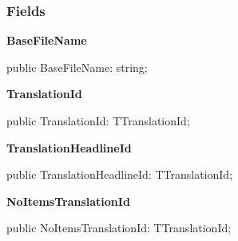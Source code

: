 \documentclass{report}
\newif\ifpdf
\begin{document}
\subsubsection*{\large{\textbf{Fields}}\normalsize\hspace{1ex}\hfill}
\begin{list}{}{
\setlength{\itemindent}{0cm}
\setlength{\listparindent}{0cm}
\setlength{\leftmargin}{\evensidemargin}
\addtolength{\leftmargin}{\tmplength}
\settowidth{\labelsep}{X}
\addtolength{\leftmargin}{\labelsep}
\setlength{\labelwidth}{\tmplength}
}
\label{PasDoc_Gen.TOverviewFileInfo-BaseFileName}
\item[\textbf{BaseFileName}\hfill]
\ifpdf
\begin{flushleft}
\fi
\begin{ttfamily}
public BaseFileName: string;\end{ttfamily}

\ifpdf
\end{flushleft}
\fi


\par  \label{PasDoc_Gen.TOverviewFileInfo-TranslationId}
\item[\textbf{TranslationId}\hfill]
\ifpdf
\begin{flushleft}
\fi
\begin{ttfamily}
public TranslationId: TTranslationId;\end{ttfamily}

\ifpdf
\end{flushleft}
\fi


\par  \label{PasDoc_Gen.TOverviewFileInfo-TranslationHeadlineId}
\item[\textbf{TranslationHeadlineId}\hfill]
\ifpdf
\begin{flushleft}
\fi
\begin{ttfamily}
public TranslationHeadlineId: TTranslationId;\end{ttfamily}

\ifpdf
\end{flushleft}
\fi


\par  \label{PasDoc_Gen.TOverviewFileInfo-NoItemsTranslationId}
\item[\textbf{NoItemsTranslationId}\hfill]
\ifpdf
\begin{flushleft}
\fi
\begin{ttfamily}
public NoItemsTranslationId: TTranslationId;\end{ttfamily}

\ifpdf
\end{flushleft}
\fi


\par  \end{list}
\ifpdf
\end{document}
